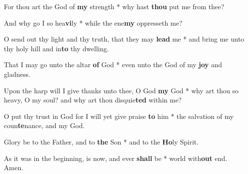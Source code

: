 \begin{multicols}{2}
	For thou art the God of \textbf{my} strength * why hast \textbf{thou} put me from thee?
	
	And why go I so hea\textbf{vi}ly * while the ene\textbf{my} oppresseth me?
	
	O send out thy light and thy truth, that they may \textbf{lead} me * and bring me unto thy holy hill and in\textbf{to} thy dwelling.
	
	That I may go unto the altar \textbf{of} God * even unto the God of my \textbf{joy} and gladness.
	
	Upon the harp will I give thanks unto thee, O God \textbf{my} God * why art thou so heavy, O my soul? and why art thou disquie\textbf{ted} within me?
	
	O put thy trust in God for I will yet give praise \textbf{to} him * the salvation of my coun\textbf{te}nance, and my God.
	
	Glory be to the Father, and to \textbf{the} Son * and to the \textbf{Ho}ly Spirit.
	
	As it was in the beginning, is now, and ever \textbf{shall} be * world with\textbf{out} end. Amen.
\end{multicols}